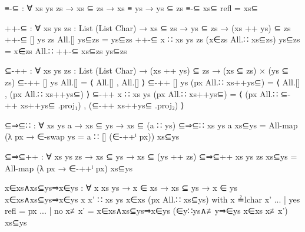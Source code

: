 \begin{code}
  ≡-⊆ : ∀ {xs ys zs} → xs ⊆ zs → xs ≡ ys → ys ⊆ zs
  ≡-⊆ xs⊆ refl = xs⊆

  ++-⊆ : ∀ {xs ys zs : List (List Char)} 
    → xs ⊆ zs → ys ⊆ zs → (xs ++ ys) ⊆ zs
  ++-⊆ {[]} {ys} {zs} All.[] ys⊆zs = ys⊆zs
  ++-⊆ {x ∷ xs} {ys} {zs} (x∈zs All.∷ xs⊆zs) ys⊆zs =
    x∈zs All.∷ ++-⊆ xs⊆zs ys⊆zs

  ⊆-++ : ∀ {xs ys zs : List (List Char)}
    → (xs ++ ys) ⊆ zs → (xs ⊆ zs) × (ys ⊆ zs)
  ⊆-++ {[]} {ys} All.[] = ⟨ All.[] , All.[] ⟩
  ⊆-++ {[]} {ys} (px All.∷ xs++ys⊆) =
    ⟨ All.[] , (px All.∷ xs++ys⊆) ⟩
  ⊆-++ {x ∷ xs} {ys} (px All.∷ xs++ys⊆) =
    ⟨ (px All.∷ ⊆-++ xs++ys⊆ .proj₁)
    , (⊆-++ xs++ys⊆ .proj₂) ⟩

  ⊆⇒⊆∷ : ∀ {xs ys a} 
    → xs ⊆ ys → xs ⊆ (a ∷ ys)
  ⊆⇒⊆∷ {xs} {ys} {a} xs⊆ys =
    All-map (λ px → ∈-swap {ys = a ∷ []} (∈-++ˡ px)) xs⊆ys

  ⊆⇒⊆++ : ∀ {xs ys zs}
    → xs ⊆ ys → xs ⊆ (ys ++ zs)
  ⊆⇒⊆++ {xs} {ys} {zs} xs⊆ys =
    All-map (λ px → ∈-++ˡ px) xs⊆ys

  x∈xs∧xs⊆ys⇒x∈ys : ∀ {x xs ys}
    → x ∈ xs → xs ⊆ ys → x ∈ ys
  x∈xs∧xs⊆ys⇒x∈ys {x} {x' ∷ xs} {ys} x∈xs (px All.∷ xs⊆ys)
    with x ≟lchar x'
  ... | yes refl = px
  ... | no  x≢x' = x∈xs∧xs⊆ys⇒x∈ys (∈y∷ys∧≢y⇒∈ys x∈xs x≢x') xs⊆ys
\end{code}
